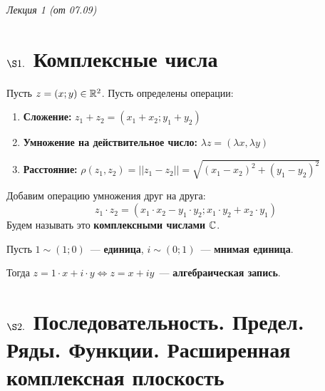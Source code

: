 \begin{flushright}
    \textit{Лекция 1 (от 07.09)}
\end{flushright}
\section{$\S 1.$ Комплексные числа}
\Def
Пусть $z = \left( x;y \right) \in \mathbb{R}^2$. Пусть определены операции:
\begin{enumerate}
    \item \textbf{Сложение:} $z_1 + z_2 = \left( x_1+x_2; y_1+y_2 \right)$
    \item \textbf{Умножение на действительное число:} $\lambda z = \left(\lambda
        x, \lambda y \right)$
    \item \textbf{Расстояние:} $\rho(z_1, z_2) = \left| \left| z_1 - z_2 \right|
    \right| = \sqrt{\left( x_1 - x_2 \right)^2 + (y_1 - y_2)^2}$
\end{enumerate}
Добавим операцию
умножения друг на друга:
\begin{equation}
  z_1 \cdot z_2 = \left( x_1 \cdot x_2 - y_1 \cdot y_2; x_1 \cdot y_2 + x_2 \cdot y_1 \right)
\end{equation}
Будем называть это \textbf{комплексными числами} $\mathbb{C}$.

Пусть $1 \sim (1; 0)$~--- \textbf{единица}, $i \sim (0;1)$~--- \textbf{мнимая
  единица}.

Тогда $z = 1 \cdot x + i \cdot y \Leftrightarrow z = x + iy$~---
\textbf{алгебраическая запись}.
\section{$\S 2.$ Последовательность. Предел. Ряды. Функции. Расширенная
  комплексная плоскость}
